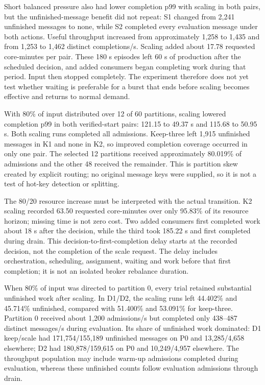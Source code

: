 Short balanced pressure also had lower completion p99 with scaling in both pairs, but the unfinished-message benefit did not repeat: S1 changed from 2,241 unfinished messages to none, while S2 completed every evaluation message under both actions. Useful throughput increased from approximately 1,258 to 1,435 and from 1,253 to 1,462 distinct completions/s. Scaling added about 17.78 requested core-minutes per pair. These 180 s episodes left 60 s of production after the scheduled decision, and added consumers began completing work during that period. Input then stopped completely. The experiment therefore does not yet test whether waiting is preferable for a burst that ends before scaling becomes effective and returns to normal demand.

With 80\% of input distributed over 12 of 60 partitions, scaling lowered completion p99 in both verified-start pairs: 121.15 to 49.37 s and 115.68 to 50.95 s. Both scaling runs completed all admissions. Keep-three left 1,915 unfinished messages in K1 and none in K2, so improved completion coverage occurred in only one pair. The selected 12 partitions received approximately 80.019\% of admissions and the other 48 received the remainder. This is partition skew created by explicit routing; no original message keys were supplied, so it is not a test of hot-key detection or splitting.

The 80/20 resource increase must be interpreted with the actual transition. K2 scaling recorded 63.50 requested core-minutes over only 95.83\% of its resource horizon; missing time is not zero cost. Two added consumers first completed work about 18 s after the decision, while the third took 185.22 s and first completed during drain. This decision-to-first-completion delay starts at the recorded decision, not the completion of the scale request. The delay includes orchestration, scheduling, assignment, waiting and work before that first completion; it is not an isolated broker rebalance duration.

When 80\% of input was directed to partition 0, every trial retained substantial unfinished work after scaling. In D1/D2, the scaling runs left 44.402\% and 45.714\% unfinished, compared with 51.400\% and 53.091\% for keep-three. Partition 0 received about 1,200 admissions/s but completed only 438--487 distinct messages/s during evaluation. Its share of unfinished work dominated: D1 keep/scale had 171,754/155,189 unfinished messages on P0 and 13,285/4,658 elsewhere; D2 had 180,878/159,615 on P0 and 10,249/4,957 elsewhere. The throughput population may include warm-up admissions completed during evaluation, whereas these unfinished counts follow evaluation admissions through drain.

